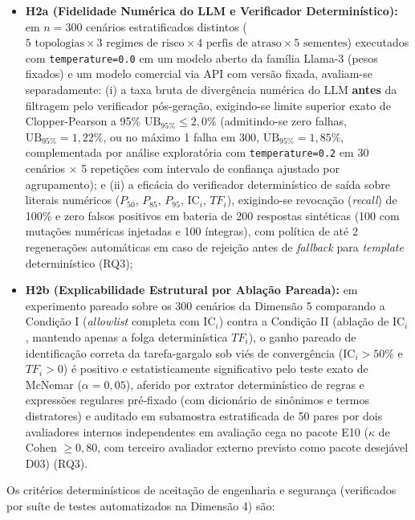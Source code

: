 \documentclass[12pt,openany,oneside,a4paper,english,brazilian,sumario=tradicional]{abntex2}
\newcommand{\IC}{\mathrm{IC}}
\begin{document}
\begin{itemize}
  \item \textbf{H2a (Fidelidade Numérica do LLM e Verificador Determinístico):} em $n=300$ cenários estratificados distintos ($5\text{ topologias} \times 3\text{ regimes de risco} \times 4\text{ perfis de atraso} \times 5\text{ sementes}$) executados com \texttt{temperature=0.0} em um modelo aberto da família Llama-3 (pesos fixados) e um modelo comercial via API com versão fixada, avaliam-se separadamente: (i) a taxa bruta de divergência numérica do LLM \textbf{antes} da filtragem pelo verificador pós-geração, exigindo-se limite superior exato de Clopper-Pearson a 95\% $\mathrm{UB}_{95\%} \le 2{,}0\%$ (admitindo-se zero falhas, $\mathrm{UB}_{95\%}=1{,}22\%$, ou no máximo 1 falha em 300, $\mathrm{UB}_{95\%}=1{,}85\%$, complementada por análise exploratória com \texttt{temperature=0.2} em 30 cenários $\times$ 5 repetições com intervalo de confiança ajustado por agrupamento); e (ii) a eficácia do verificador determinístico de saída sobre literais numéricos ($P_{50}$, $P_{85}$, $P_{95}$, $\IC_i$, $TF_i$), exigindo-se revocação (\textit{recall}) de 100\% e zero falsos positivos em bateria de 200 respostas sintéticas (100 com mutações numéricas injetadas e 100 íntegras), com política de até 2 regenerações automáticas em caso de rejeição antes de \textit{fallback} para \textit{template} determinístico (RQ3);
  \item \textbf{H2b (Explicabilidade Estrutural por Ablação Pareada):} em experimento pareado sobre os 300 cenários da Dimensão 5 comparando a Condição I (\textit{allowlist} completa com $\IC_i$) contra a Condição II (ablação de $\IC_i$, mantendo apenas a folga determinística $TF_i$), o ganho pareado de identificação correta da tarefa-gargalo sob viés de convergência ($\IC_i > 50\%$ e $TF_i > 0$) é positivo e estatisticamente significativo pelo teste exato de McNemar ($\alpha=0{,}05$), aferido por extrator determinístico de regras e expressões regulares pré-fixado (com dicionário de sinônimos e termos distratores) e auditado em subamostra estratificada de 50 pares por dois avaliadores internos independentes em avaliação cega no pacote E10 ($\kappa$ de Cohen $\ge 0{,}80$, com terceiro avaliador externo previsto como pacote desejável D03) (RQ3).
\end{itemize}

Os critérios determinísticos de aceitação de engenharia e segurança (verificados por suíte de testes automatizados na Dimensão 4) são:
\end{document}

